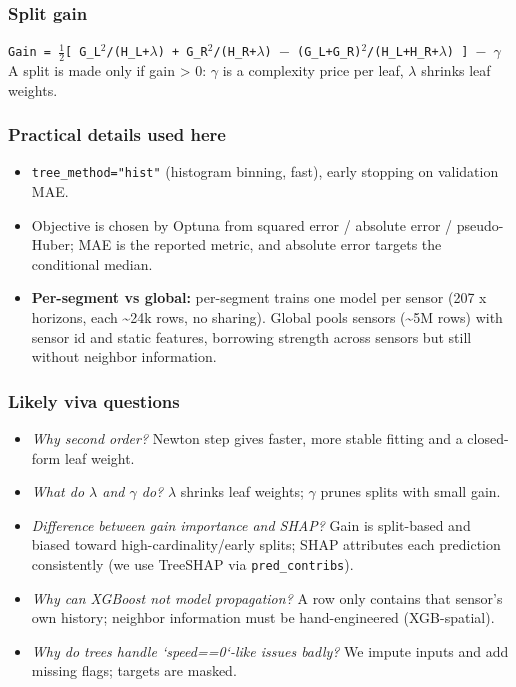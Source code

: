 \documentclass[10pt,a4paper]{article}
\begin{document}
\subsubsection*{Split gain}
\texttt{Gain = \ensuremath{\tfrac{1}{2}}[ G\_\allowbreak{}L\ensuremath{^{2}}/\allowbreak{}(H\_\allowbreak{}L+\ensuremath{\lambda}) + G\_\allowbreak{}R\ensuremath{^{2}}/\allowbreak{}(H\_\allowbreak{}R+\ensuremath{\lambda}) \ensuremath{-} (G\_\allowbreak{}L+G\_\allowbreak{}R)\ensuremath{^{2}}/\allowbreak{}(H\_\allowbreak{}L+H\_\allowbreak{}R+\ensuremath{\lambda}) ] \ensuremath{-} \ensuremath{\gamma}} A split is made only if gain > 0: \ensuremath{\gamma} is a complexity price per leaf, \ensuremath{\lambda} shrinks leaf weights.

\subsubsection*{Practical details used here}
\begin{itemize}[nosep,leftmargin=*]
\item \texttt{tree\_\allowbreak{}method="hist"} (histogram binning, fast), early stopping on validation MAE.
\item Objective is chosen by Optuna from squared error /\allowbreak{} absolute error /\allowbreak{} pseudo-Huber; MAE is the reported metric, and absolute error targets the conditional median.
\item \textbf{Per-segment vs global:} per-segment trains one model per sensor (207 x horizons, each \textasciitilde{}24k rows, no sharing). Global pools sensors (\textasciitilde{}5M rows) with sensor id and static features, borrowing strength across sensors but still without neighbor information.
\end{itemize}

\subsubsection*{Likely viva questions}
\begin{itemize}[nosep,leftmargin=*]
\item \emph{Why second order?} Newton step gives faster, more stable fitting and a closed-form leaf weight.
\item \emph{What do \ensuremath{\lambda} and \ensuremath{\gamma} do?} \ensuremath{\lambda} shrinks leaf weights; \ensuremath{\gamma} prunes splits with small gain.
\item \emph{Difference between gain importance and SHAP?} Gain is split-based and biased toward high-cardinality/\allowbreak{}early splits; SHAP attributes each prediction consistently (we use TreeSHAP via \texttt{pred\_\allowbreak{}contribs}).
\item \emph{Why can XGBoost not model propagation?} A row only contains that sensor's own history; neighbor information must be hand-engineered (XGB-spatial).
\item \emph{Why do trees handle `speed==0`-like issues badly?} We impute inputs and add missing flags; targets are masked.
\end{itemize}
\end{document}
